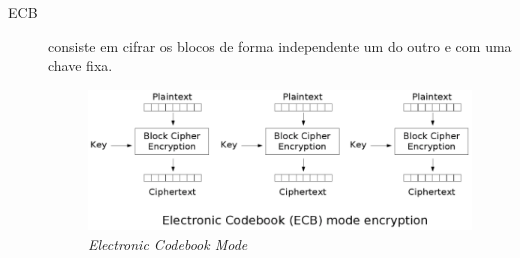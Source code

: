 \begin{description}
\item [ECB]consiste em cifrar os blocos de forma independente um do outro e com uma chave fixa.
\begin{figure}[h]
\centering
\includegraphics[keepaspectratio=true,scale=0.7]
	{figuras/ecb.eps}
	\caption{\textit{Electronic Codebook Mode}}
	

\end{figure}
\end{description}
